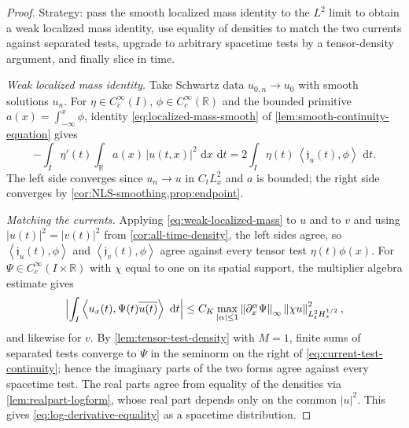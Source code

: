 \documentclass[11pt,oneside]{book}
\providecommand{\uses}[1]{}
\theoremstyle{definition}
\theoremstyle{remark}
\newcommand{\R}{\mathbb R}
\newcommand{\1}{\mathbf 1}
\newcommand{\dd}{\,\mathrm d}
\newcommand{\norm}[1]{\left\lVert #1\right\rVert}
\newcommand{\abs}[1]{\left\lvert #1\right\rvert}
\newcommand{\pair}[2]{\left\langle #1,#2\right\rangle}
\begin{document}
\begin{proof}
\uses{def:endpoint-current, lem:smooth-continuity-equation, lem:realpart-logform, lem:tensor-test-density, lem:distribution-slicing, lem:quadratic-form-extension, cor:all-time-density, prop:endpoint, cor:NLS-smoothing}
Strategy: pass the smooth localized mass identity to the $L^2$ limit to obtain
a weak localized mass identity, use equality of densities to match the two
currents against separated tests, upgrade to arbitrary spacetime tests by a
tensor-density argument, and finally slice in time.

\emph{Weak localized mass identity.} Take Schwartz data $u_{0,n}\to u_0$ with
smooth solutions $u_n$. For $\eta\in C_c^\infty(I)$, $\phi\in C_c^\infty(\R)$
and the bounded primitive $a(x)=\int_{-\infty}^x\phi$, identity
\eqref{eq:localized-mass-smooth} of \cref{lem:smooth-continuity-equation} gives
\begin{equation}
 -\int_I\eta'(t)\!\int_\R a(x)\,|u(t,x)|^2\,\dd x\,\dd t
 =2\int_I\eta(t)\,\pair{\mathfrak j_u(t)}{\phi}\,\dd t .
 \label{eq:weak-localized-mass}
\end{equation}
The left side converges since $u_n\to u$ in $C_tL^2_x$ and $a$ is bounded; the
right side converges by \cref{cor:NLS-smoothing,prop:endpoint}.

\emph{Matching the currents.} Applying \eqref{eq:weak-localized-mass} to $u$
and to $v$ and using $|u(t)|^2=|v(t)|^2$ from \cref{cor:all-time-density}, the
left sides agree, so $\pair{\mathfrak j_u(t)}{\phi}$ and
$\pair{\mathfrak j_v(t)}{\phi}$ agree against every tensor test
$\eta(t)\phi(x)$. For $\Psi\in C_c^\infty(I\times\R)$ with $\chi$ equal to one
on its spatial support, the multiplier algebra estimate gives
\begin{equation}
 \Bigl|\int_I\pair{u_x(t)}{\Psi(t)\overline{u(t)}}\,\dd t\Bigr|
 \le C_K\max_{|\alpha|\le1}\norm{\partial_x^\alpha\Psi}_\infty
       \norm{\chi u}_{L^2_tH^{1/2}_x}^2, \label{eq:current-test-continuity}
\end{equation}
and likewise for $v$. By \cref{lem:tensor-test-density} with $M=1$, finite
sums of separated tests converge to $\Psi$ in the seminorm on the right of
\eqref{eq:current-test-continuity}; hence the imaginary parts of the two forms
agree against every spacetime test. The real parts agree from equality of the
densities via \cref{lem:realpart-logform}, whose real part depends only on the common $\abs u^2$.
This gives \eqref{eq:log-derivative-equality} as a spacetime distribution.


\end{proof}
\end{document}
